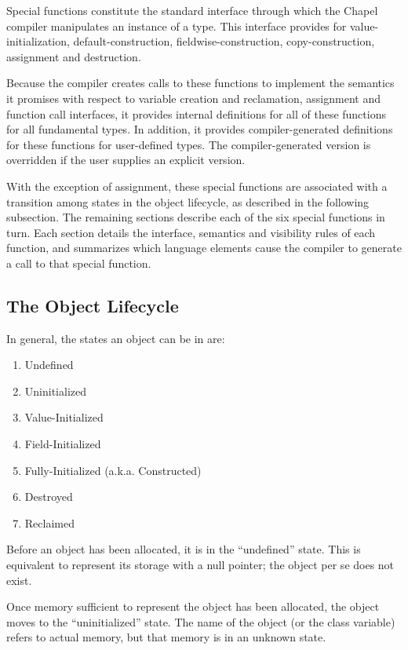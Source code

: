 
Special functions constitute the standard interface through which the Chapel
compiler manipulates an instance of a type.  This interface provides for
value-initialization, default-construction, fieldwise-construction,
copy-construction, assignment and destruction.

Because the compiler creates calls to these functions to implement the semantics
it promises with respect to variable creation and reclamation, assignment and
function call interfaces, it provides internal definitions for all of these functions for
all fundamental types.  In addition, it provides compiler-generated definitions
for these functions for user-defined types.  The compiler-generated version is
overridden if the user supplies an explicit version.

With the exception of assignment, these special functions are associated with a
transition among states in the object lifecycle, as described in the following subsection.
The remaining sections describe each of the six special functions in turn.
Each section details the interface, semantics and visibility rules of each
function, and summarizes which language elements cause the compiler to generate
a call to that special function.

\subsection{The Object Lifecycle}

In general, the states an object can be in are:
\begin{enumerate}
\item Undefined
\item Uninitialized
\item Value-Initialized
\item Field-Initialized
\item Fully-Initialized (a.k.a. Constructed)
\item Destroyed
\item Reclaimed
\end{enumerate}

Before an object has been allocated, it is in the ``undefined'' state.  This is
equivalent to represent its storage with a null pointer; the object per se does
not exist.

Once memory sufficient to represent the object has been allocated, the object
moves to the ``uninitialized'' state.  The name of the object (or the class
variable) refers to actual memory, but that memory is in an unknown state.

